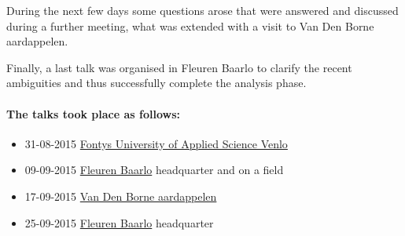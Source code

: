 During the next few days some questions arose that were answered and discussed during a further meeting, what was extended with a visit to Van Den Borne aardappelen.

Finally, a last talk was organised in Fleuren Baarlo to clarify the recent ambiguities and thus successfully complete the analysis phase.

\paragraph{The talks took place as follows:}
\begin{itemize}
	\item 31-08-2015 \href{http://fontys.nl}{Fontys University of Applied Science Venlo}
	\item 09-09-2015 \href{http://fleuren.net}{Fleuren Baarlo} headquarter and on a field
	\item 17-09-2015 \href{http://www.vandenborneaardappelen.com}{Van Den Borne aardappelen}
	\item 25-09-2015 \href{http://fleuren.net}{Fleuren Baarlo} headquarter
\end{itemize}
